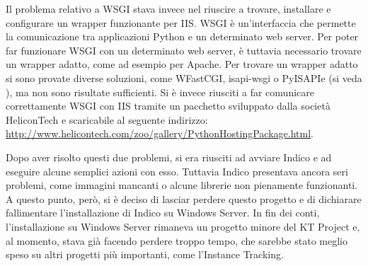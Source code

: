         Il problema relativo a \ac{WSGI} stava invece nel riuscire a trovare, installare e configurare un wrapper funzionante per \ac{IIS}. \ac{WSGI} è un'interfaccia che permette la comunicazione tra applicazioni Python e un determinato web server. Per poter far funzionare \ac{WSGI} con un determinato web server, è tuttavia necessario trovare un wrapper adatto, come ad esempio  per Apache. Per trovare un wrapper adatto si sono provate diverse soluzioni, come WFastCGI, isapi-wsgi o PyISAPIe (si veda \cite{wiki:wsgi}), ma non sono risultate sufficienti. Si è invece riusciti a far comunicare correttamente \ac{WSGI} con \ac{IIS} tramite un pacchetto sviluppato dalla società HeliconTech e scaricabile al seguente indirizzo: \url{http://www.helicontech.com/zoo/gallery/PythonHostingPackage.html}.
        
        Dopo aver risolto questi due problemi, si era riusciti ad avviare Indico e ad eseguire alcune semplici azioni con esso. Tuttavia Indico presentava ancora seri problemi, come immagini mancanti o alcune librerie non pienamente funzionanti. A questo punto, però, si è deciso di lasciar perdere questo progetto e di dichiarare fallimentare l'installazione di Indico su Windows Server. In fin dei conti, l'installazione su Windows Server rimaneva un progetto minore del KT Project e, al momento, stava già facendo perdere troppo tempo, che sarebbe stato meglio speso su altri progetti più importanti, come l'Instance Tracking.

